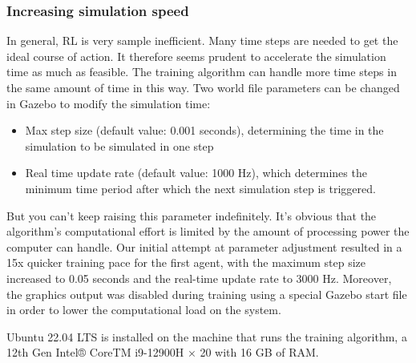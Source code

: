 \documentclass[conference]{IEEEtran}
\begin{document}
\subsubsection{Increasing simulation speed}
In general, RL is very sample inefficient. Many time steps are needed to get the ideal course of action. It therefore seems prudent to accelerate the simulation time as much as feasible. The training algorithm can handle more time steps in the same amount of time in this way. Two world file parameters can be changed in Gazebo to modify the simulation time:
\begin{itemize}
    \item Max step size (default value: 0.001 seconds), determining the  time in the simulation to be simulated in one step
    \item  Real time update rate (default value: 1000 Hz), which determines the minimum time period after which the next simulation step is triggered.
\end{itemize}
But you can't keep raising this parameter indefinitely. It's obvious that the algorithm's computational effort is limited by the amount of processing power the computer can handle. 
Our initial attempt at parameter adjustment resulted in a 15x quicker training pace for the first agent, with the maximum step size increased to 0.05 seconds and the real-time update rate to 3000 Hz. 
Moreover, the graphics output was disabled during training using a special Gazebo start file in order to lower the computational load on the system. \par
Ubuntu 22.04 LTS is installed on the machine that runs the training algorithm, a 12th Gen Intel® CoreTM i9-12900H × 20 with 16 GB of RAM. 
\end{document}
